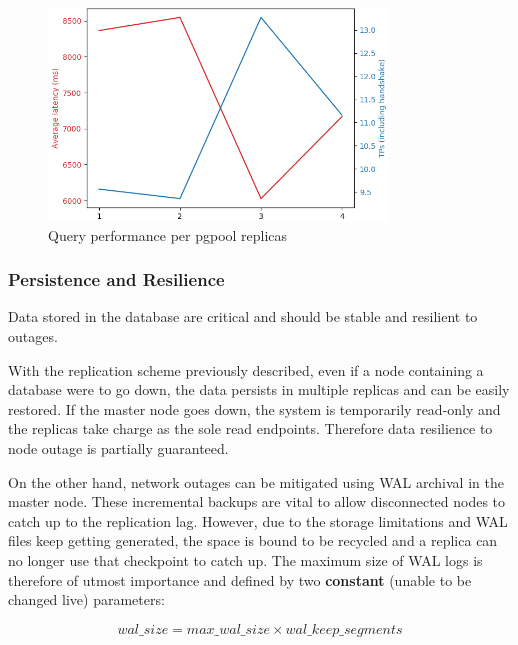 \documentclass[11pt]{article}
\begin{document}
\begin{figure}[h]
    \centering
    \includegraphics[width=0.8\textwidth]{vulas_pgpool_benchmark.png}
    \caption{Query performance per pgpool replicas}
    \label{fig:vulas_db_pgpool_replicas}
\end{figure}

\subsubsection{Persistence and Resilience} \label{sec:vulas_db_resilience}

\vspace{-2mm}\hspace{5mm} Data stored in the database are critical and should be stable and resilient to outages. 

With the replication scheme previously described, even if a node containing a database were to go down, the data persists in multiple replicas and can be easily restored. If the master node goes down, the system is temporarily read-only and the replicas take charge as the sole read endpoints. Therefore data resilience to node outage is partially guaranteed. 

On the other hand, network outages can be mitigated using WAL archival in the master node. These incremental backups are vital to allow disconnected nodes to catch up to the replication lag. However, due to the storage limitations and WAL files keep getting generated, the space is bound to be recycled and a replica can no longer use that checkpoint to catch up. The maximum size of WAL logs is therefore of utmost importance and defined by two \textbf{constant} (unable to be changed live) parameters:

\begin{equation}
    wal\_size = max\_wal\_size \times wal\_keep\_segments
\end{equation}
\end{document}
